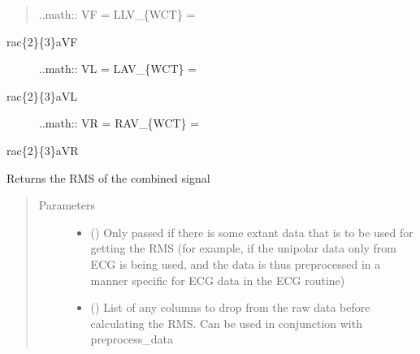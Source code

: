 \documentclass[letterpaper,10pt,english]{sphinxmanual}
\begin{document}
\begin{fulllineitems}
\begin{fulllineitems}
\begin{quote}
\sphinxAtStartPar
..math:: VF = LL\sphinxhyphen{}V\_\{WCT\} =
\end{quote}
\begin{description}
\item[{rac\{2\}\{3\}aVF}] \leavevmode
\sphinxAtStartPar
..math:: VL = LA\sphinxhyphen{}V\_\{WCT\} =

\item[{rac\{2\}\{3\}aVL}] \leavevmode
\sphinxAtStartPar
..math:: VR = RA\sphinxhyphen{}V\_\{WCT\} =

\end{description}

\sphinxAtStartPar
rac\{2\}\{3\}aVR

\end{fulllineitems}


\begin{fulllineitems}
\label{\detokenize{_autosummary/signalanalysis.vcg.Vcg:signalanalysis.vcg.Vcg.get_rms}}
\sphinxAtStartPar
Returns the RMS of the combined signal
\begin{quote}\begin{description}
\item[{Parameters}] \leavevmode\begin{itemize}
\item {} 
\sphinxAtStartPar
{} (\sphinxstyleliteralemphasis{\sphinxupquote{, }}) \textendash{} Only passed if there is some extant data that is to be used for getting the RMS (for example,
if the unipolar data only from ECG is being used, and the data is thus preprocessed in a manner specific
for ECG data in the ECG routine)

\item {} 
\sphinxAtStartPar
{} (\sphinxstyleliteralemphasis{\sphinxupquote{, }}) \textendash{} List of any columns to drop from the raw data before calculating the RMS. Can be used in conjunction with
preprocess\_data


\end{itemize}
\end{description}
\end{quote}
\end{fulllineitems}
\end{fulllineitems}
\end{document}
